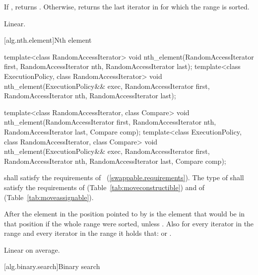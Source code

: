 \begin{itemdescr}
\pnum
\returns If , returns
. Otherwise, returns
the last iterator  in  for which the
range  is sorted.

\pnum
\complexity Linear.
\end{itemdescr}

[alg.nth.element]{Nth element}

%
\begin{itemdecl}
template<class RandomAccessIterator>
  void nth_element(RandomAccessIterator first, RandomAccessIterator nth,
                   RandomAccessIterator last);
template<class ExecutionPolicy, class RandomAccessIterator>
  void nth_element(ExecutionPolicy&& exec,
                   RandomAccessIterator first, RandomAccessIterator nth,
                   RandomAccessIterator last);

template<class RandomAccessIterator, class Compare>
  void nth_element(RandomAccessIterator first, RandomAccessIterator nth,
                   RandomAccessIterator last,  Compare comp);
template<class ExecutionPolicy, class RandomAccessIterator, class Compare>
  void nth_element(ExecutionPolicy&& exec,
                   RandomAccessIterator first, RandomAccessIterator nth,
                   RandomAccessIterator last, Compare comp);
\end{itemdecl}

\begin{itemdescr}
\pnum
\requires
{} shall satisfy the requirements of
~(\ref{swappable.requirements}). The type
of  shall satisfy the requirements of
 (Table~\ref{tab:moveconstructible}) and of
 (Table~\ref{tab:moveassignable}).

\pnum
\effects
After
the element in the position pointed to by 
is the element that would be
in that position if the whole range were sorted, unless .
Also for every iterator
in the range
and every iterator
in the range
it holds that:
or
.

\pnum
\complexity
Linear on average.
\end{itemdescr}

[alg.binary.search]{Binary search}

